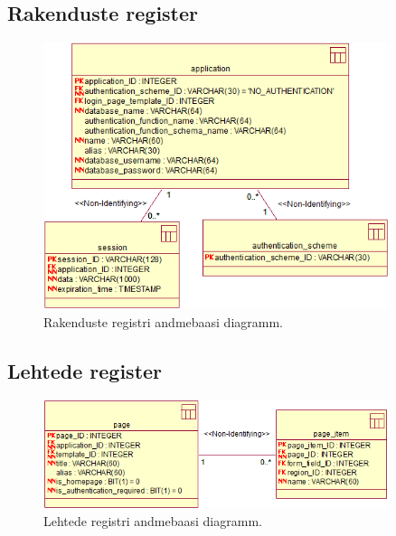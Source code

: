 \documentclass[a4paper,12pt]{article} %
\begin{document}
\subsection*{Rakenduste register}
\begin{figure}[H]
\centering
\includegraphics[width=0.9\textwidth]{./diagrams/applications-db-diagram.png}
\caption{Rakenduste registri andmebaasi diagramm.}
\label{fig_rakenduste_registri_andmebaasi_diagramm}
\end{figure}

\subsection*{Lehtede register}
\begin{figure}[H]
\centering
\includegraphics[width=0.9\textwidth]{./diagrams/page-db-diagram.png}
\caption{Lehtede registri andmebaasi diagramm.}
\label{fig_lehtede_registri_andmebaasi_diagramm}
\end{figure}
\end{document}

